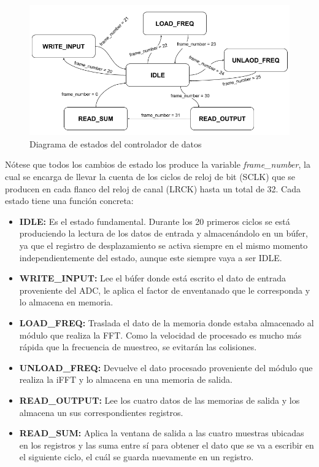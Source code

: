 \begin{figure}[!th]
\begin{center}
\includegraphics[width=13cm]{img/destados.png}
\caption{\label{fig:estados}Diagrama de estados del controlador de datos}
\end{center}
\end{figure}

Nótese que todos los cambios de estado los produce la variable \emph{frame\_number}, la cual se encarga de llevar la cuenta de los ciclos de reloj de bit (SCLK) que se producen en cada flanco del reloj de canal (LRCK) hasta un total de 32. Cada estado tiene una función concreta: 
\begin{itemize}
\item \textbf{IDLE:} Es el estado fundamental. Durante los 20 primeros ciclos se está produciendo la lectura de los datos de entrada y almacenándolo en un búfer, ya que el registro de desplazamiento se activa siempre en el mismo momento independientemente del estado, aunque este siempre vaya a ser IDLE.
\item \textbf{WRITE\_INPUT:} Lee el búfer donde está escrito el dato de entrada proveniente del ADC, le aplica el factor de enventanado que le corresponda y lo almacena en memoria.
\item \textbf{LOAD\_FREQ:} Traslada el dato de la memoria donde estaba almacenado al módulo que realiza la FFT. Como la velocidad de procesado es mucho más rápida que la frecuencia de muestreo, se evitarán las colisiones.
\item \textbf{UNLOAD\_FREQ:} Devuelve el dato procesado proveniente del módulo que realiza la iFFT y lo almacena en una memoria de salida.
\item \textbf{READ\_OUTPUT:} Lee los cuatro datos de las memorias de salida y los almacena un sus correspondientes registros.
\item \textbf{READ\_SUM:} Aplica la ventana de salida a las cuatro muestras ubicadas en los registros y las suma entre sí para obtener el dato que se va a escribir en el siguiente ciclo, el cuál se guarda nuevamente en un registro.
\end{itemize}

